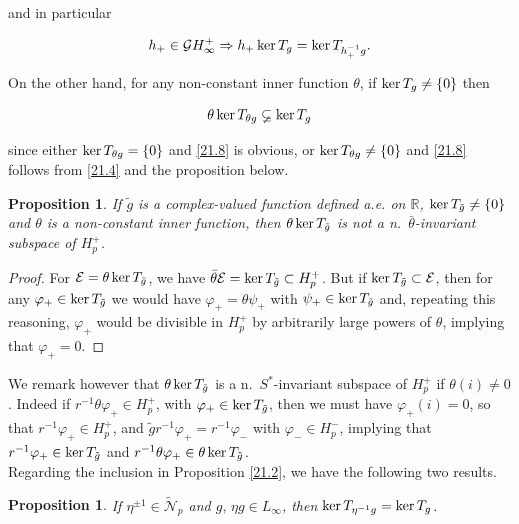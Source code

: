 \documentclass[11pt]{article}
\def\RR{\mathbb{R}}
\def\ker{\mathop{\rm ker}\nolimits}
\def\nei#1{n.~$#1$-in\-vari\-ant}
\renewcommand\phi{\varphi}
\newtheorem{prop}[thm]{Proposition}
\numberwithin{equation}{section}
\def\beginpf{\begin{proof}}
\def\endpf{\end{proof}}
\begin{document}
and in particular

\begin{equation}\label{21.7}
h_+\in \mathcal{G}H_\infty^+ \Rightarrow h_+\ker T_g = \ker T_{h_+^{-1} g}.
\end{equation}

On the other hand, for any non-constant inner function $\theta$, if $\ker T_g \neq \{0\}$ then

\begin{equation}\label{21.8}
\theta\ker T_{\theta g} \varsubsetneq \ker T_{g}
\end{equation}

since either $\ker T_{\theta g}= \{0\}$ and  \eqref {21.8} is obvious, or $\ker T_{\theta g}\neq \{0\}$ and \eqref {21.8} 
follows from \eqref {21.4} and the proposition below.

\begin{prop}\label{thm:2.4} If $\tilde g$ is a complex-valued function defined a.e. on $\RR$, $\ker T_{\tilde g}\neq \{0\}$ and $\theta$ is a non-constant inner function, then $\theta \ker T_{\tilde g}$ is not a \nei{\bar{\theta}} subspace of $H_p^+$.
\end{prop}

\beginpf For $\mathcal{E}= \theta \ker T_{\tilde g}$, we have $\bar{\theta} \mathcal{E}= \ker T_{\tilde g} \subset H_p^+$. But if $\ker T_{\tilde g} \subset \mathcal{E}$, then for any $\phi_+ \in \ker T_{\tilde g}$ we would have $\phi_+= \theta \psi_+$ with $\psi_+ \in \ker T_{\tilde g}$ and, repeating this reasoning, $\phi_+$ would be divisible in $H_p^+$ by arbitrarily large powers of $\theta$, implying that $\phi_+=0$.
\endpf

We remark however that $\theta \ker T_{\tilde g}$ is a \nei{S^*} subspace of $H_p^+$ if $\theta (i)\neq 0$. Indeed if $r^{-1}\theta \phi_+ \in H_p^+$, with $\phi_+ \in \ker T_{\tilde g}$, then we must have $\phi_+(i)=0$, so that $r^{-1}\phi_+ \in H_p^+$, and ${\tilde g}r^{-1}\phi_+=r^{-1}\phi_-$ with $\phi_- \in H_p^-$, implying that $r^{-1} \phi_+ \in \ker T_{\tilde g}$ and $r^{-1} \theta \phi_+\in \theta \ker T_{\tilde g}$.\\

Regarding the inclusion in Proposition \ref{21.2}, we have the following two results.

\begin{prop} If $\eta^{\pm 1} \in \widetilde{\mathcal{N}}_p$ and $g,\, \eta g \in L_\infty$, then $\ker T_{\eta^{-1}g}=\ker T_g$.
\end{prop}
\end{document}
